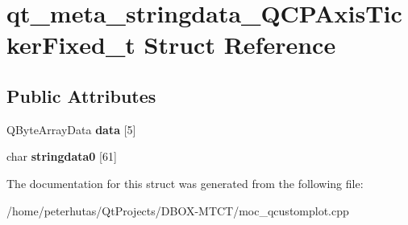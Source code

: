 \hypertarget{structqt__meta__stringdata___q_c_p_axis_ticker_fixed__t}{}\section{qt\+\_\+meta\+\_\+stringdata\+\_\+\+Q\+C\+P\+Axis\+Ticker\+Fixed\+\_\+t Struct Reference}
\label{structqt__meta__stringdata___q_c_p_axis_ticker_fixed__t}
\subsection*{Public Attributes}
\begin{DoxyCompactItemize}
\item 
\mbox{\label{structqt__meta__stringdata___q_c_p_axis_ticker_fixed__t_a6a154326b81876525a18cc787d72999a}} 
Q\+Byte\+Array\+Data {\bfseries data} \mbox{[}5\mbox{]}
\item 
\mbox{\label{structqt__meta__stringdata___q_c_p_axis_ticker_fixed__t_a4624793f0a8202895228fd43a030e135}} 
char {\bfseries stringdata0} \mbox{[}61\mbox{]}
\end{DoxyCompactItemize}


The documentation for this struct was generated from the following file\+:\begin{DoxyCompactItemize}
\item 
/home/peterhutas/\+Qt\+Projects/\+D\+B\+O\+X-\/\+M\+T\+C\+T/moc\+\_\+qcustomplot.\+cpp\end{DoxyCompactItemize}
